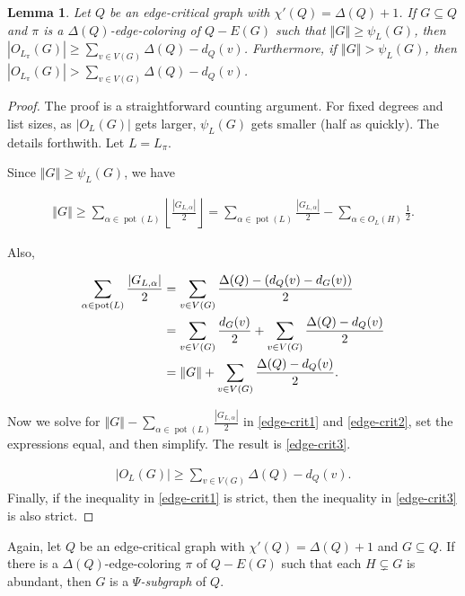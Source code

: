 \documentclass[12pt]{article}
\theoremstyle{plain}
\newtheorem{lem}[thm]{Lemma}
\theoremstyle{definition}
\theoremstyle{remark}
\newcommand{\card}[1]{\left|#1\right|}
\newcommand{\size}[1]{\left\Vert#1\right\Vert}
\newcommand{\floor}[1]{\left\lfloor#1\right\rfloor}
\newcommand{\pot}{\operatorname{pot}}
\begin{document}
\begin{lem}\label{LowPsiGivesManyOddColors}
Let $Q$ be an edge-critical graph with $\chi'(Q) = \Delta(Q) + 1$. If $G
\subseteq Q$ and $\pi$ is a $\Delta(Q)$-edge-coloring of $Q - E(G)$ such that
$\size{G}\ge \psi_L(G) $, then $\card{O_{L_\pi}(G)} \ge \sum_{v \in V(G)}
\Delta(Q) - d_Q(v)$.  Furthermore, if $\size{G} > \psi_L(G)$, then
$\card{O_{L_\pi}(G)} > \sum_{v \in V(G)} \Delta(Q) - d_Q(v)$.
\end{lem}
\begin{proof}
The proof is a straightforward counting argument.  For fixed degrees and list
sizes, as $\card{O_L(G)}$ gets larger, $\psi_L(G)$ gets smaller (half as
quickly).  The details forthwith.  Let $L = L_\pi$.

Since $\size{G} \ge \psi_L(G)$, we have 

\begin{align}
\label{edge-crit1}
\size{G} \ge 
\sum_{\alpha \in \pot(L)} \floor{\frac{\card{G_{L, \alpha}}}{2}}  =
\sum_{\alpha \in \pot(L)} \frac{\card{G_{L, \alpha}}}{2} -  \sum_{\alpha \in
	O_L(H)} \frac12 
.\end{align}
	
\noindent 
Also,

\begin{align}
\sum_{\alpha \in \pot(L)} \frac{\card{G_{L, \alpha}}}{2} 
&= \sum_{v \in V(G)} \frac{\Delta(Q) - (d_Q(v)-d_G(v))}{2} \notag\\
&= \sum_{v \in V(G)} \frac{d_G(v)}{2} + \sum_{v \in V(G)} \frac{\Delta(Q) - d_Q(v)}{2}\notag\\
&= \size{G} +  \sum_{v \in V(G)} \frac{\Delta(Q) - d_Q(v)}{2}.
\label{edge-crit2}
\end{align}
	
\noindent Now we solve for $\size{G}-
\sum_{\alpha \in \pot(L)} \frac{\card{G_{L, \alpha}}}{2}$ in 
\eqref{edge-crit1} and \eqref{edge-crit2}, set the expressions equal, and then
simplify.  The result is \eqref{edge-crit3}.
	
\begin{align}
\card{O_L(G)} \ge \sum_{v \in V(G)} \Delta(Q) - d_Q(v).
\label{edge-crit3}
\end{align}
Finally, if the inequality in \eqref{edge-crit1} is strict, then the inequality
in \eqref{edge-crit3} is also strict.
\end{proof}

Again, let $Q$ be an edge-critical graph with $\chi'(Q) = \Delta(Q) + 1$ and $G
\subseteq Q$.  If there is a $\Delta(Q)$-edge-coloring $\pi$ of $Q - E(G)$ such
that each $H \subsetneq G$ is abundant, then $G$ is a \emph{$\Psi$-subgraph} of
$Q$.
\end{document}
